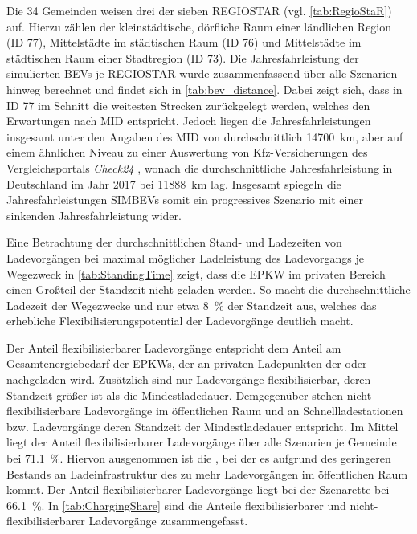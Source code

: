 Die \num{34} Gemeinden weisen drei der sieben \gls{REGIOSTAR} (vgl. \autoref{tab:RegioStaR}) auf.
Hierzu zählen der kleinstädtische, dörfliche Raum einer ländlichen Region (\gls{ID} \num{77}), Mittelstädte im städtischen Raum (\gls{ID} \num{76}) und Mittelstädte im städtischen Raum einer Stadtregion (\gls{ID} \num{73}).
Die Jahresfahrleistung der simulierten \glspl{BEV} je \gls{REGIOSTAR} wurde zusammenfassend über alle Szenarien hinweg berechnet und findet sich in \autoref{tab:bev_distance}.
Dabei zeigt sich, dass in \gls{ID} \num{77} im Schnitt die weitesten Strecken zurückgelegt werden, welches den Erwartungen nach \gls{MID} \cite{Nobis2019} entspricht.
Jedoch liegen die Jahresfahrleistungen insgesamt unter den Angaben des \gls{MID} von durchschnittlich \SI{14700}{\km}, aber auf einem ähnlichen Niveau zu einer Auswertung von Kfz-Versicherungen des Vergleichsportals \textit{Check24} \cite{CHECK24GmbH2018}, wonach die durchschnittliche Jahresfahrleistung in Deutschland im Jahr \num{2017} bei \SI{11888}{\km} lag.
Insgesamt spiegeln die Jahresfahrleistungen \glspl{SIMBEV} somit ein progressives Szenario mit einer sinkenden Jahresfahrleistung wider.




Eine Betrachtung der durchschnittlichen Stand- und Ladezeiten von Ladevorgängen bei maximal möglicher Ladeleistung des Ladevorgangs je Wegezweck in \autoref{tab:StandingTime} zeigt, dass die \gls{EPKW} im privaten Bereich einen Großteil der Standzeit nicht geladen werden.
So macht die durchschnittliche Ladezeit der Wegezwecke \nH und \Arbeit nur etwa \SI{8}{\percent} der Standzeit aus, welches das erhebliche Flexibilisierungspotential der Ladevorgänge deutlich macht.



Der Anteil flexibilisierbarer Ladevorgänge entspricht dem Anteil am Gesamtenergiebedarf der \glspl{EPKW}, der an privaten Ladepunkten der \UCs \zH oder \Firmeparkplatz nachgeladen wird.
Zusätzlich sind nur Ladevorgänge flexibilisierbar, deren Standzeit größer ist als die Mindestladedauer.
Demgegenüber stehen nicht-flexibilisierbare Ladevorgänge im öffentlichen Raum und an Schnellladestationen bzw. Ladevorgänge deren Standzeit der Mindestladedauer entspricht.
Im Mittel liegt der Anteil flexibilisierbarer Ladevorgänge über alle Szenarien je Gemeinde bei \SI{71.1}{\percent}.
Hiervon ausgenommen ist die \SzeFirmenparkplatzdot, bei der es aufgrund des geringeren Bestands an Ladeinfrastruktur des \UC \Firmeparkplatz zu mehr Ladevorgängen im öffentlichen Raum kommt.
Der Anteil flexibilisierbarer Ladevorgänge liegt bei der Szenarette bei \SI{66.1}{\percent}.
In \autoref{tab:ChargingShare} sind die Anteile flexibilisierbarer und nicht-flexibilisierbarer Ladevorgänge zusammengefasst.

